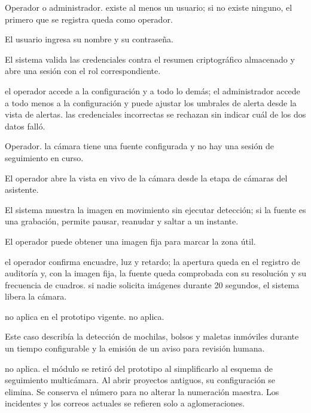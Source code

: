   {Operador o administrador.}
  {existe al menos un usuario; si no existe ninguno, el primero que se registra queda como
   operador.}
  {\item El usuario ingresa su nombre y su contraseña.
   \item El sistema valida las credenciales contra el resumen criptográfico almacenado y abre una
         sesión con el rol correspondiente.}
  {el operador accede a la configuración y a todo lo demás; el administrador accede a todo
   menos a la configuración y puede ajustar los umbrales de alerta desde la vista de alertas.}
  {las credenciales incorrectas se rechazan sin indicar cuál de los dos datos falló.}

  {Operador.}
  {la cámara tiene una fuente configurada y no hay una sesión de seguimiento en curso.}
  {\item El operador abre la vista en vivo de la cámara desde la etapa de cámaras del asistente.
   \item El sistema muestra la imagen en movimiento sin ejecutar detección; si la fuente es una
         grabación, permite pausar, reanudar y saltar a un instante.
   \item El operador puede obtener una imagen fija para marcar la zona útil.}
  {el operador confirma encuadre, luz y retardo; la apertura queda en el registro de auditoría y,
   con la imagen fija, la fuente queda comprobada con su resolución y su frecuencia de cuadros.}
  {si nadie solicita imágenes durante 20 segundos, el sistema libera la cámara.}

  {no aplica en el prototipo vigente.}
  {no aplica.}
  {\item Este caso describía la detección de mochilas, bolsos y maletas inmóviles durante un
         tiempo configurable y la emisión de un aviso para revisión humana.}
  {no aplica.}
  {el módulo se retiró del prototipo al simplificarlo al esquema de seguimiento multicámara. Al
   abrir proyectos antiguos, su configuración se elimina. Se conserva el número para no alterar
   la numeración maestra. Los incidentes y los correos actuales se refieren solo a
   aglomeraciones.}

